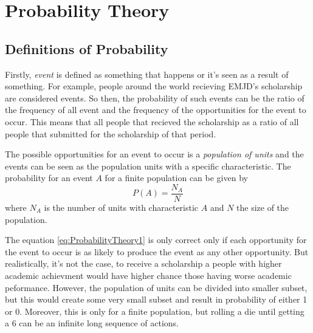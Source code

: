 \chapter{Probability Theory}
\section{Definitions of Probability}
Firstly, \emph{event} is defined as something that happens or it's seen as a result of something. For example, people around the world recieving EMJD's scholarship are considered events. So then, the probability of such events can be the ratio 
of the frequency of all event and the frequency of the opportunities for the event to occur. This means that all people that recieved the scholarship as a ratio of all people that submitted for the scholarship of that period. 

The possible opportunities for an event to occur is a \emph{population of units} and the events can be seen as the population units with a specific characteristic. The probability for an event $A$ for a finite population can be given by
\begin{equation}\label{eq:ProbabilityTheory1}
    P(A)=\frac{N_A}{N}
\end{equation}
where $N_A$ is the number of units with characteristic $A$ and $N$ the size of the population.

The equation \cref{eq:ProbabilityTheory1} is only correct only if  each opportunity for the event to occur is as likely to produce the event as any other opportunity. But realistically, it's not the case, to receive a scholarship a people
with higher academic achievment would have higher chance those having worse academic peformance. However, the population of units can be divided into smaller subset, but this would create some very small subset and result in probability of 
either 1 or 0. Moreover, this is only for a finite population, but rolling a die until getting a 6 can be an infinite long sequence of actions.

